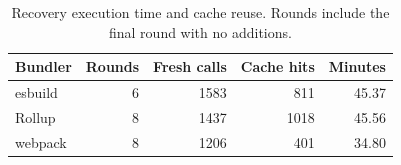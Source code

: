 \begin{table}[t]
\caption{Recovery execution time and cache reuse. Rounds include the final round with no additions.}
\label{tab:v8-runtime}
\centering
\small
\begin{tabular}{lrrrr}
\toprule
Bundler & Rounds & Fresh calls & Cache hits & Minutes\\
\midrule
esbuild & 6 & 1583 & 811 & 45.37\\
Rollup & 8 & 1437 & 1018 & 45.56\\
webpack & 8 & 1206 & 401 & 34.80\\
\bottomrule
\end{tabular}
\end{table}
